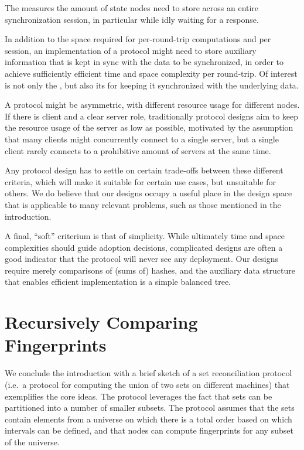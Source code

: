 The  measures the amount of state
nodes need to store across an entire synchronization session, in particular
while idly waiting for a response.

In addition to the space required for per-round-trip computations and per session, an
implementation of a protocol might need to store auxiliary information
that is kept in sync with the data to be synchronized, in order to
achieve sufficiently efficient time and space complexity per round-trip.
Of interest is not only the , but also its  for keeping it
synchronized with the underlying data.

A protocol might be asymmetric, with different resource usage for different nodes.
If there is client and a clear server role, traditionally protocol designs aim to
keep the resource usage of the server as low as possible, motivated by the assumption
that many clients might concurrently connect to a single server, but a single client rarely
connects to a prohibitive amount of servers at the same time.

Any protocol design has to settle on certain trade-offs between these
different criteria, which will make it suitable for certain use cases,
but unsuitable for others. We do believe that our designs occupy a
useful place in the design space that is applicable to many relevant
problems, such as those mentioned in the introduction.

A final, ``soft'' criterium is that of simplicity. While ultimately time
and space complexities should guide adoption decisions, complicated
designs are often a good indicator that the protocol will never see any
deployment. Our designs require merely comparisons of (sums of) hashes,
and the auxiliary data structure that enables efficient implementation
is a simple balanced tree.

\section{Recursively Comparing
Fingerprints}\label{recursively-comparing-fingerprints}

We conclude the introduction with a brief sketch of a set reconciliation
protocol (i.e.~a protocol for computing the union of two sets on
different machines) that exemplifies the core ideas. The protocol
leverages the fact that sets can be partitioned into a number of smaller
subsets. The protocol assumes that the sets contain elements from
a universe on which there is a total order based on which intervals can be
defined, and that nodes can compute fingerprints for any subset of the
universe.

